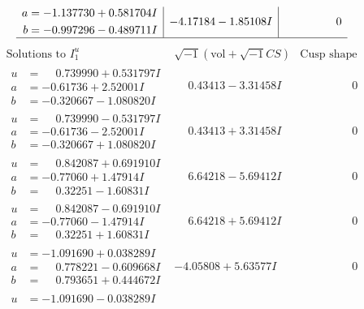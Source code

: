 \documentclass[1p]{elsarticle_modified}
\theoremstyle{definition}
\newcommand{\I}{\sqrt{-1}}
\begin{document}
$$\begin{array}{c|c|c}
\begin{aligned}
a &= -1.137730 + 0.581704 I \\
b &= -0.997296 - 0.489711 I\end{aligned}
 & -4.17184 - 1.85108 I & \phantom{-0.000000 } 0\\
 \hline 
 \end{array}$$\newpage$$\begin{array}{c|c|c}  
\text{Solutions to }I^u_{1}& \I (\text{vol} + \sqrt{-1}CS) & \text{Cusp shape}\\
 \hline 
\begin{aligned}
u &= \phantom{-}0.739990 + 0.531797 I \\
a &= -0.61736 + 2.52001 I \\
b &= -0.320667 - 1.080820 I\end{aligned}
 & \phantom{-}0.43413 - 3.31458 I & \phantom{-0.000000 } 0 \\ \hline\begin{aligned}
u &= \phantom{-}0.739990 - 0.531797 I \\
a &= -0.61736 - 2.52001 I \\
b &= -0.320667 + 1.080820 I\end{aligned}
 & \phantom{-}0.43413 + 3.31458 I & \phantom{-0.000000 } 0 \\ \hline\begin{aligned}
u &= \phantom{-}0.842087 + 0.691910 I \\
a &= -0.77060 + 1.47914 I \\
b &= \phantom{-}0.32251 - 1.60831 I\end{aligned}
 & \phantom{-}6.64218 - 5.69412 I & \phantom{-0.000000 } 0 \\ \hline\begin{aligned}
u &= \phantom{-}0.842087 - 0.691910 I \\
a &= -0.77060 - 1.47914 I \\
b &= \phantom{-}0.32251 + 1.60831 I\end{aligned}
 & \phantom{-}6.64218 + 5.69412 I & \phantom{-0.000000 } 0 \\ \hline\begin{aligned}
u &= -1.091690 + 0.038289 I \\
a &= \phantom{-}0.778221 - 0.609668 I \\
b &= \phantom{-}0.793651 + 0.444672 I\end{aligned}
 & -4.05808 + 5.63577 I & \phantom{-0.000000 } 0 \\ \hline\begin{aligned}
u &= -1.091690 - 0.038289 I \\

\end{aligned}
\end{array}$$
\end{document}
